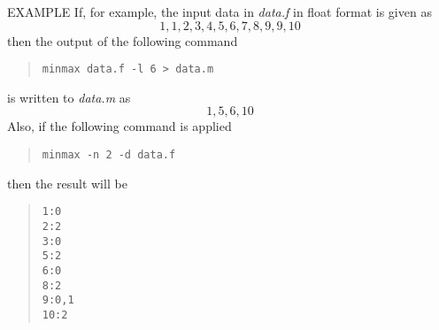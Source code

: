 \begin{qsection}{EXAMPLE}
If, for example, the input data in {\em data.f} in float format
is given as
\[1,1,2,3,4,5,6,7,8,9,9,10\]
then the output of the following command
\begin{quote}
 \verb!minmax data.f -l 6 > data.m!
\end{quote}
is written to {\em data.m} as
\[1,5,6,10\]
Also, if the following command is applied
\begin{quote}
 \verb!minmax -n 2 -d data.f!
\end{quote}
then the result will be
\begin{quote}
 \verb!1:0!\\
 \verb!2:2!\\
 \verb!3:0!\\
 \verb!5:2!\\
 \verb!6:0!\\
 \verb!8:2!\\
 \verb!9:0,1!\\
 \verb!10:2!
\end{quote}
\end{qsection}
